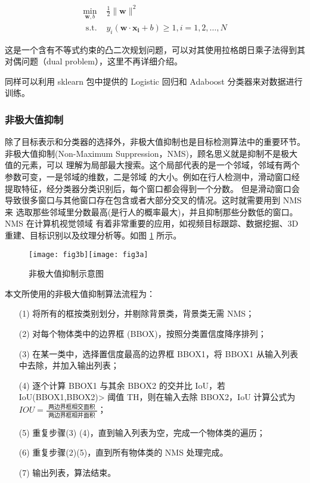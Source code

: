 \begin{equation}
\begin{array}{ll}
\min _{\boldsymbol{w}, b} & \frac{1}{2}\|\boldsymbol{w}\|^2 \\
\text { s.t. } & y_i\left(\boldsymbol{w} \cdot \boldsymbol{x}_{\boldsymbol{i}}+b\right) \geq 1, i=1,2, \ldots, N
\end{array}
\end{equation}

这是一个含有不等式约束的凸二次规划问题，可以对其使用拉格朗日乘子法得到其对偶问题（dual problem），这里不再详细介绍。

\vspace{0.3cm}


同样可以利用 sklearn 包中提供的 Logistic 回归和 Adaboost 分类器来对数据进行训练。

\subsubsection{非极大值抑制}

除了目标表示和分类器的选择外，非极大值抑制也是目标检测算法中的重要环节。非极大值抑制(Non-Maximum Suppression，NMS)，顾名思义就是抑制不是极大值的元素，可以 理解为局部最大搜索。这个局部代表的是一个邻域，邻域有两个参数可变，一是邻域的维数，二是邻域 的大小。例如在行人检测中，滑动窗口经提取特征，经分类器分类识别后，每个窗口都会得到一个分数。 但是滑动窗口会导致很多窗口与其他窗口存在包含或者大部分交叉的情况。这时就需要用到 NMS 来 选取那些邻域里分数最高(是行人的概率最大)，并且抑制那些分数低的窗口。NMS 在计算机视觉领域 有着非常重要的应用，如视频目标跟踪、数据挖掘、3D 重建、目标识别以及纹理分析等。如图 \ref{fig:nms} 所示。

\begin{figure}[!ht]
  \centering
  \texttt{[image: fig3b]}\texttt{[image: fig3a]}
  \caption{非极大值抑制示意图}
  \label{fig:nms}
\end{figure} 

本文所使用的非极大值抑制算法流程为：

\begin{enumerate}
	\item[(1)]将所有的框按类别划分，并剔除背景类，背景类无需 NMS；
	\item[(2)]对每个物体类中的边界框 (BBOX)，按照分类置信度降序排列；
	\item[(3)]在某一类中，选择置信度最高的边界框 BBOX1，将 BBOX1 从输入列表中去除，并加入输出列表；
	\item[(4)]逐个计算 BBOX1 与其余 BBOX2 的交并比 IoU，若 IoU(BBOX1,BBOX2)> 阈值 TH，则在输入去除 BBOX2，IoU 计算公式为 $I O U=\frac{\text { 两边界框相交面积 }}{\text { 两边界框相并面积 }}$；
	\item[(5)]重复步骤(3) (4)，直到输入列表为空，完成一个物体类的遍历；
	\item[(6)]重复步骤(2)(5)，直到所有物体类的 NMS 处理完成。
	\item[(7)]输出列表，算法结束。
\end{enumerate}

